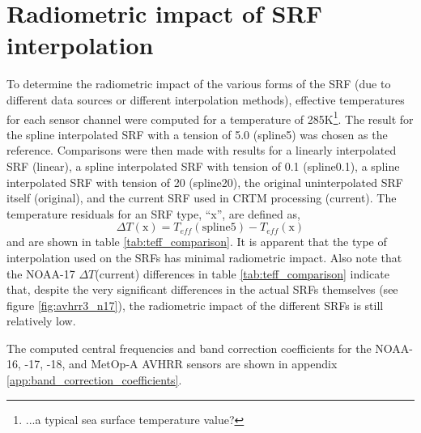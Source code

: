 \section{Radiometric impact of SRF interpolation}
To determine the radiometric impact of the various forms of the SRF (due to different data sources or different interpolation methods), effective temperatures for each sensor channel were computed for a temperature of 285K\footnote{...a typical sea surface temperature value?}. The result for the spline interpolated SRF with a tension of 5.0 (spline5) was chosen as the reference. Comparisons were then made with results for a linearly interpolated SRF (linear), a spline interpolated SRF with tension of 0.1 (spline0.1), a spline interpolated SRF with tension of 20 (spline20), the original uninterpolated SRF itself (original), and the current SRF used in CRTM processing (current). The temperature residuals for an SRF type, ``x'', are defined as,
\begin{equation}
  \Delta T(\textrm{x}) = T_{eff}(\textrm{spline5}) - T_{eff}(\textrm{x})
\end{equation}
and are shown in table \ref{tab:teff_comparison}. It is apparent that the type of interpolation used on the SRFs has minimal radiometric impact. Also note that the NOAA-17 $\Delta T$(current) differences in table \ref{tab:teff_comparison} indicate that, despite the very significant differences in the actual SRFs themselves (see figure \ref{fig:avhrr3_n17}), the radiometric impact of the different SRFs is still relatively low.

The computed central frequencies and band correction coefficients for the NOAA-16, -17, -18, and MetOp-A AVHRR sensors are shown in appendix \ref{app:band_correction_coefficients}.

